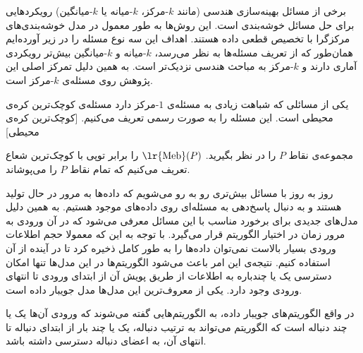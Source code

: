 برخی از مسائل بهینه‌سازی هندسی (مانند $k$-مرکز، $k$-میانه یا $k$-میانگین) رویکردهایی برای حل مسائل خوشه‌بندی است. این روش‌ها به طور معمول در مدل خوشه‌بندی‌های مرکزگرا با تخصیص قطعی داده هستند.  اهداف این سه نوع مسئله را در زیر آورده‌ایم
 
همان‌طور که از تعریف مسئله‌ها به نظر می‌رسد، $k$-میانه و $k$-میانگین بیش‌تر رویکردی آماری دارند و $k$-مرکز به مباحث هندسی نزدیک‌تر است. به همین دلیل تمرکز اصلی این پژوهش روی مسئله‌ی $k$-مرکز است.

یکی از مسائلی که شباهت زیادی به مسئله‌ی $1$-مرکز دارد مسئله‌ی کوچک‌ترین کره‌ی محیطی است. این مسئله را به صورت رسمی تعریف می‌کنیم.
[کوچک‌ترین کره‌ی محیطی]

مجموعه‌ی نقاط $P$ را در نظر بگیرید. $\text{\lr{Meb}}(P)$ را برابر توپی با کوچک‌ترین شعاع تعریف می‌کنیم که تمام نقاط $P$ را می‌پوشاند.

روز به روز با مسائل بیش‌تری رو به رو می‌شویم که داده‌ها به مرور در حال تولید هستند و به دنبال پاسخ‌دهی به مسئله‌ای روی داده‌های موجود هستیم. به همین دلیل مدل‌های جدیدی برای برخورد مناسب با این مسائل معرفی می‌شود که در آن ورودی به مرور زمان در اختیار الگوریتم قرار می‌گیرد.
با توجه به این که معمولا حجم اطلاعات ورودی بسیار بالاست نمی‌توان داده‌ها را به طور کامل ذخیره کرد تا در آینده از آن استفاده کنیم.  نتیجه‌ی این امر باعث می‌شود الگوریتم‌ها در این مدل‌ها تنها امکان دسترسی یک یا چندباره به اطلاعات از طریق پویش آن از ابتدای ورودی تا انتهای ورودی وجود دارد. یکی از معروف‌ترین این مدل‌ها مدل جویبار داده است.

در واقع الگوریتم‌های جویبار داده، به الگوریتم‌هایی گفته می‌شوند که ورودی آن‌ها یک یا چند دنباله است که الگوریتم می‌تواند به ترتیب دنباله، یک یا چند بار از ابتدای دنباله تا انتهای آن، به اعضای دنباله دسترسی داشته باشد.

